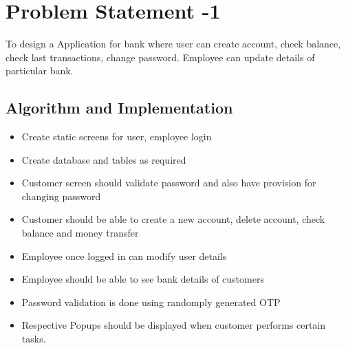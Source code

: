 \documentclass[12pt]{article}
\begin{document}
  \section{Problem Statement -1}
 To design a Application for bank where user can create account, check balance, check last transactions, change password. Employee can update details of particular bank.
  
  \subsection{Algorithm and Implementation}
  \begin{itemize}
  \item Create static screens for user, employee login 
  \item Create database and tables as required
  \item Customer screen should validate password and also have provision for changing password
  \item Customer should be able to create a new account, delete account, check balance and money transfer
  \item Employee once logged in can modify user details
  \item Employee should be able to see bank details of customers
  \item Password validation is done using randomply generated OTP
  \item Respective Popups should be displayed when customer performs certain tasks.
  \end{itemize}
  \newpage
\end{document}
